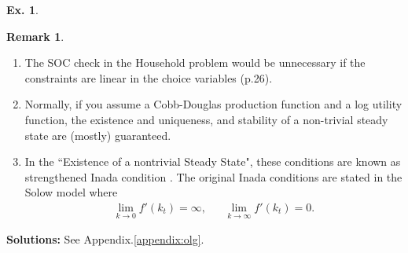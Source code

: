 \documentclass[11pt,a4paper]{book}
\theoremstyle{definition}\newtheorem{definition}{Definition}
\theoremstyle{definition}\newtheorem{fact}{Fact}
\theoremstyle{definition}\newtheorem{remark}{Remark}
\theoremstyle{definition}\newtheorem{ex}{Ex.}
\theoremstyle{definition}\newtheorem{project}{Project}
\theoremstyle{definition}\newtheorem{problem}{Problem}
\theoremstyle{definition}\newtheorem{example}{Example}
\numberwithin{theorem}{section}
\numberwithin{corollary}{chapter}
\numberwithin{assumption}{chapter}
\numberwithin{definition}{chapter}
\numberwithin{prop}{chapter}
\numberwithin{notation}{chapter}
\numberwithin{problem}{chapter}
\numberwithin{example}{chapter}
\numberwithin{fact}{chapter}
\numberwithin{ex}{chapter}
\begin{document}
\begin{ex}
		\begin{remark}
			\begin{enumerate}
				\item The SOC check in the Household problem would be unnecessary if the constraints are linear in the choice variables \citep{de2012fertility} (p.26).
				\item Normally, if you assume a Cobb-Douglas production function and a log utility function, the existence and uniqueness, and stability of a non-trivial steady state are (mostly) guaranteed.
				\item In the ``Existence of a nontrivial Steady State", these conditions are known as strengthened Inada condition \citep{galor1989existence}. The original Inada conditions are stated in the Solow model where
				\begin{align*}
					\lim_{k\to 0} f'(k_t) = \infty, && \lim_{k\to\infty} f'(k_t) = 0.
				\end{align*}
			\end{enumerate}
		\end{remark}
		
	\textbf{Solutions:} See Appendix.\ref{appendix:olg}. 	
	\end{ex}
	
\end{document}
